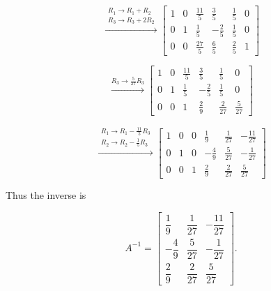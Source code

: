 \documentclass[journal]{IEEEtran}
\begin{document}
\[
\overset{\substack{R_1 \to R_1 + R_2 \\ R_3 \to R_3 + 2R_2}}{\longrightarrow}
\left[\begin{array}{ccc|ccc}
1 & 0 & \tfrac{11}{5} & \tfrac{3}{5} & \tfrac{1}{5} & 0\\
0 & 1 & \tfrac{1}{5} & -\tfrac{2}{5} & \tfrac{1}{5} & 0\\
0 & 0 & \tfrac{27}{5} & \tfrac{6}{5} & \tfrac{2}{5} & 1
\end{array}\right]
\]

\[
\overset{R_3 \to \tfrac{5}{27}R_3}{\longrightarrow}
\left[\begin{array}{ccc|ccc}
1 & 0 & \tfrac{11}{5} & \tfrac{3}{5} & \tfrac{1}{5} & 0\\
0 & 1 & \tfrac{1}{5} & -\tfrac{2}{5} & \tfrac{1}{5} & 0\\
0 & 0 & 1 & \tfrac{2}{9} & \tfrac{2}{27} & \tfrac{5}{27}
\end{array}\right]
\]

\[
\overset{\substack{R_1 \to R_1 - \tfrac{11}{5}R_3 \\ R_2 \to R_2 - \tfrac{1}{5}R_3}}{\longrightarrow}
\left[\begin{array}{ccc|ccc}
1 & 0 & 0 & \tfrac{1}{9} & \tfrac{1}{27} & -\tfrac{11}{27}\\
0 & 1 & 0 & -\tfrac{4}{9} & \tfrac{5}{27} & -\tfrac{1}{27}\\
0 & 0 & 1 & \tfrac{2}{9} & \tfrac{2}{27} & \tfrac{5}{27}
\end{array}\right]
\]

Thus the inverse is

\[
A^{-1} =
\begin{bmatrix}
\dfrac{1}{9} & \dfrac{1}{27} & -\dfrac{11}{27}\\[6pt]
-\dfrac{4}{9} & \dfrac{5}{27} & -\dfrac{1}{27}\\[6pt]
\dfrac{2}{9} & \dfrac{2}{27} & \dfrac{5}{27}
\end{bmatrix}.
\]
\end{document}
